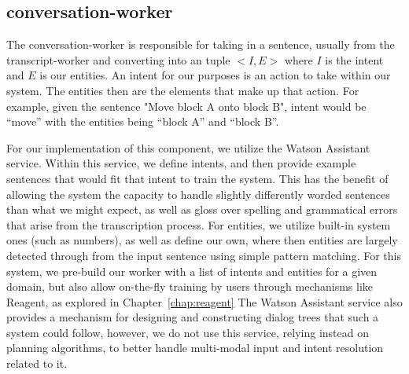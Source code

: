 \subsection{conversation-worker}

The conversation-worker is responsible for taking in a sentence, usually from the
transcript-worker and converting into an tuple $<I, E>$ where $I$ is the intent and
$E$ is our entities. An intent for our purposes is an action to take within our system.
The entities then are the elements that make up that action. For example, given the
sentence "Move block A onto block B", intent would be ``move'' with the entities being
``block A'' and ``block B''.

For our implementation of this component, we utilize the Watson Assistant service. Within this 
service, we define intents, and then provide example sentences that would fit that intent
to train the system. This has the benefit of allowing the system the capacity to handle slightly 
differently worded sentences than what we might expect, as well as gloss over spelling and 
grammatical errors that arise from the transcription process. For entities, we utilize built-in 
system ones (such as numbers), as well as define our own, where then entities are largely detected 
through from the input sentence using simple pattern matching. For this system, we
pre-build our worker with a list of intents and entities for a given domain, but also
allow on-the-fly training by users through mechanisms like Reagent, as explored in 
Chapter~\ref{chap:reagent} The Watson Assistant service also provides a mechanism
for designing and constructing dialog trees that such a system could follow, however, we
do not use this service, relying instead on planning algorithms, to better handle multi-modal
input and intent resolution related to it.
